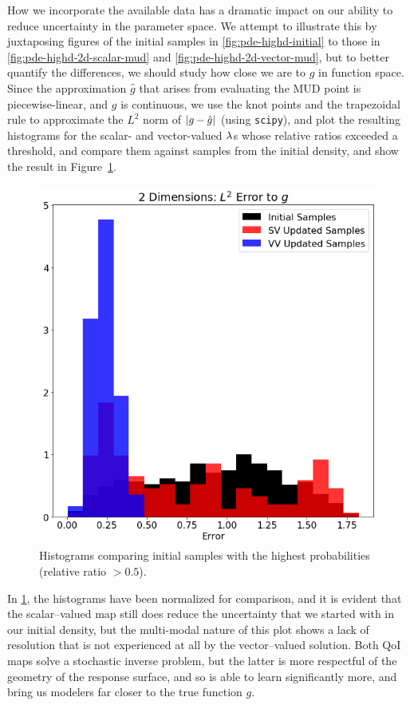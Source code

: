 How we incorporate the available data has a dramatic impact on our ability to reduce uncertainty in the parameter space.
We attempt to illustrate this by juxtaposing figures of the initial samples in \ref{fig:pde-highd-initial} to those in \ref{fig:pde-highd-2d-scalar-mud} and \ref{fig:pde-highd-2d-vector-mud}, but to better quantify the differences, we should study how close we are to $g$ in function space.
Since the approximation $\hat{g}$ that arises from evaluating the MUD point is piecewise-linear, and $g$ is continuous, we use the knot points and the trapezoidal rule to approximate the $L^2$ norm of $\left\vert g - \hat{g}\right\vert$ (using {\tt scipy}), and plot the resulting histograms for the scalar- and vector-valued $\lambda$s whose relative ratios exceeded a threshold, and compare them against samples from the initial density, and show the result in Figure~\ref{fig:pde-highd-2d-hist}.


\begin{figure}[htbp]
\centering
  \includegraphics[width=0.675\linewidth]{figures/pde-highd/pde-highd_hist_D2_t5-0E-01}
\caption{
Histograms comparing initial samples with the highest probabilities (relative ratio $> 0.5$).
}
\label{fig:pde-highd-2d-hist}
\end{figure}

In \ref{fig:pde-highd-2d-hist}, the histograms have been normalized for comparison, and it is evident that the scalar--valued map still does reduce the uncertainty that we started with in our initial density, but the multi-modal nature of this plot shows a lack of resolution that is not experienced at all by the vector--valued solution.
Both QoI maps solve a stochastic inverse problem, but the latter is more respectful of the geometry of the response surface, and so is able to learn significantly more, and bring us modelers far closer to the true function $g$.


